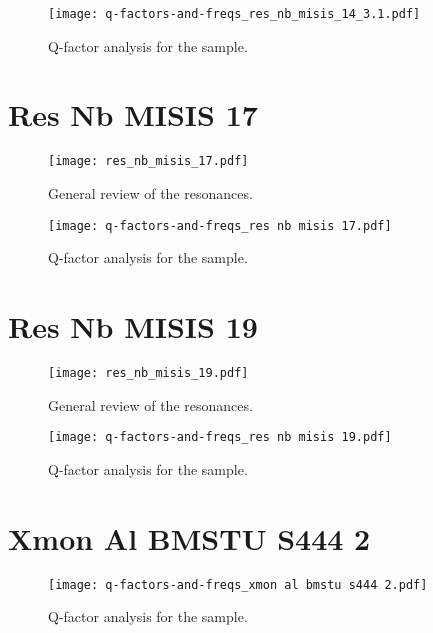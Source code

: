 \documentclass[12pt]{article}
\numberwithin{equation}{section}
\numberwithin{figure}{section}
\begin{document}
\begin{figure}[h!]
\centering
\texttt{[image: q-factors-and-freqs\_res\_nb\_misis\_14\_3.1.pdf]}

\caption{Q-factor analysis for the sample.}
\end{figure}

\newpage

\section{Res Nb MISIS 17}

\begin{figure}[h!]
\centering
\texttt{[image: res\_nb\_misis\_17.pdf]}

\caption{ General review of the resonances.}
\end{figure}

\begin{figure}[h!]
\centering
\texttt{[image: q-factors-and-freqs\_res nb misis 17.pdf]}

\caption{Q-factor analysis for the sample.}
\end{figure}

\newpage

\section{Res Nb MISIS 19}

\begin{figure}[h!]
\centering
\texttt{[image: res\_nb\_misis\_19.pdf]}

\caption{ General review of the resonances.}
\end{figure}

\begin{figure}[h!]
\centering
\texttt{[image: q-factors-and-freqs\_res nb misis 19.pdf]}

\caption{Q-factor analysis for the sample.}
\end{figure}

\section{Xmon Al BMSTU S444 2}

\begin{figure}[h!]
\centering
\texttt{[image: q-factors-and-freqs\_xmon al bmstu s444 2.pdf]}

\caption{Q-factor analysis for the sample.}
\end{figure}
\end{document}
